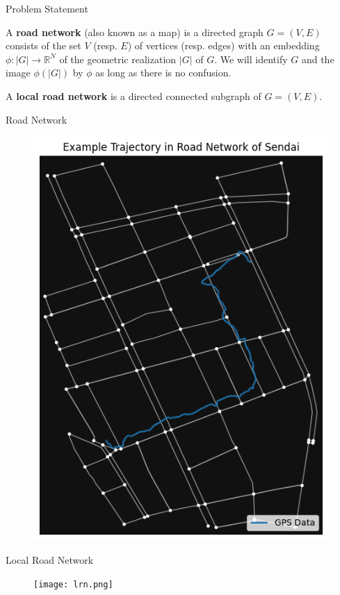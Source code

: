 \documentclass[aspectratio=169, bigfiles]{beamer}
\begin{document}
\begin{frame}{Problem Statement}
\begin{definition} \label{RN}
A  \textbf{road network} (also known as a map) is a directed graph $G=(V,E)$ consists of the set $V$ (resp. $E$) of vertices (resp. edges) with an embedding $\phi:|G|\rightarrow\mathbb{R}^N$ of the geometric realization $|G|$ of $G$.
We will identify $G$ and the image $\phi(|G|)$ by $\phi$ as long as there is no confusion.
\end{definition}
\begin{definition} \label{LRN}
A  \textbf{local road network} is a directed connected subgraph of $G=(V,E)$.
\end{definition}
\end{frame}


\begin{frame}{Road Network}
\vspace{-.21cm}
\begin{figure}
    \centering
    \includegraphics[scale=.43]{trajectoryandroads.png}
\end{figure}
\end{frame}
\begin{frame}{Local Road Network}
\vspace{-.1cm}
\begin{figure}
    \centering
    \texttt{[image: lrn.png]}
\end{figure}
\end{frame}
\end{document}
